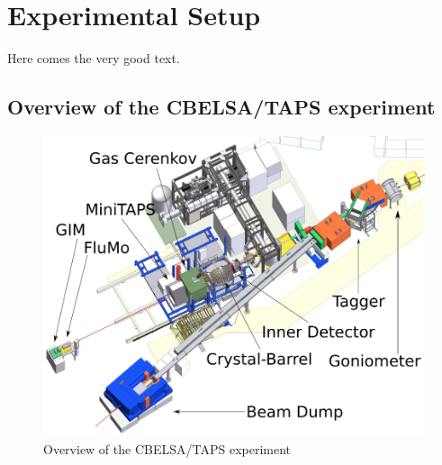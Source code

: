 \chapter{Experimental Setup}
Here comes the very good text.
\section{Overview of the CBELSA/TAPS experiment}
\begin{figure}[htbp]
	\centering
	\includegraphics[width=\linewidth]{figs/CB-Area.png}
	\caption{Overview of the CBELSA/TAPS experiment \cite{cb}}
\end{figure}
